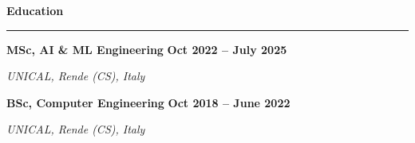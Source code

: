 \documentclass[9pt, a4paper]{article}
\newcommand{\cvsection}[1]{%
	\vspace{2pt}\par
	{\Large\bfseries\color{sectionblue}#1}\par
	\vspace{2pt}\hrule\vspace{6pt}
}
\newcommand{\cvsubsection}[3]{%
	\par {\large\bfseries #1} \hfill {\bfseries #2} \par {\textit{#3}} \vspace{4pt}
}
\newcommand{\cvproject}[1]{%
	\par {{\bfseries{\textit{#1}}}} \par \vspace{4pt}
}
\begin{document}
\begin{minipage}[t]{0.65\linewidth}
		
		\vspace{10pt}\par
		\cvsection{Education}
		
		\cvsubsection{MSc, AI \& ML Engineering}{Oct 2022 -- July 2025}{UNICAL, Rende (CS), Italy}
		\cvsubsection{BSc, Computer Engineering}{Oct 2018 -- June 2022}{UNICAL, Rende (CS), Italy}
		
	\end{minipage}%
	\hfill%
\end{document}
